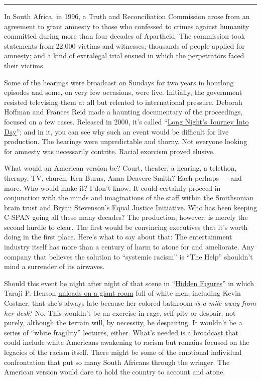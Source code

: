 \begin{center}\rule{0.5\linewidth}{\linethickness}\end{center}

In South Africa, in 1996, a Truth and Reconciliation Commission arose
from an agreement to grant amnesty to those who confessed to crimes
against humanity committed during more than four decades of Apartheid.
The commission took statements from 22,000 victims and witnesses;
thousands of people applied for amnesty; and a kind of extralegal trial
ensued in which the perpetrators faced their victims.

Some of the hearings were broadcast on Sundays for two years in hourlong
episodes and some, on very few occasions, were live. Initially, the
government resisted televising them at all but relented to international
pressure. Deborah Hoffman and Frances Reid made a haunting documentary
of the proceedings, focused on a few cases. Released in 2000, it's
called
``\href{https://www.nytimes3xbfgragh.onion/2000/03/29/movies/film-review-following-south-africa-s-wrenching-road-to-truth.html}{Long
Night's Journey Into Day}''; and in it, you can see why such an event
would be difficult for live production. The hearings were unpredictable
and thorny. Not everyone looking for amnesty was necessarily contrite.
Racial exorcism proved elusive.

What would an American version be? Court, theater, a hearing, a
telethon, therapy, TV, church, Ken Burns, Anna Deavere Smith? Each
perhaps --- and more. Who would make it? I don't know. It could
certainly proceed in conjunction with the minds and imaginations of the
staff within the Smithsonian brain trust and Bryan Stevenson's Equal
Justice Initiative. Who has been keeping C-SPAN going all these many
decades? The production, however, is merely the second hurdle to clear.
The first would be convincing executives that it's worth doing in the
first place. Here's what to say about that: The entertainment industry
itself has more than a century of harm to atone for and ameliorate. Any
company that believes the solution to ``systemic racism'' is ``The
Help'' shouldn't mind a surrender of its airwaves.

Should this event be night after night of that scene in
``\href{https://www.nytimes3xbfgragh.onion/2016/12/22/movies/hidden-figures-review.html}{Hidden
Figures}'' in which Taraji P. Henson
\href{https://www.youtube.com/watch?v=9j6p7ajuh-E}{unloads on a giant
room} full of white men, including Kevin Costner, that she's always late
because her colored bathroom \emph{is a mile away from her desk}? No.
This wouldn't be an exercise in rage, self-pity or despair, not purely,
although the terrain will, by necessity, be despairing. It wouldn't be a
series of ``white fragility'' lectures, either. What's needed is a
broadcast that could include white Americans awakening to racism but
remains focused on the legacies of the racism itself. There might be
some of the emotional individual confrontation that put so many South
Africans through the wringer. The American version would dare to hold
the country to account and atone.

